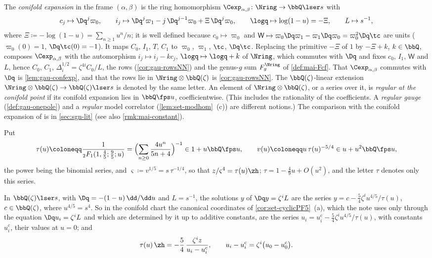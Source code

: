 \begin{defn}
The \emph{conifold expansion} in the frame $(\alpha,\beta)$ is the ring homomorphism $\Cexp_{\alpha,\beta}\colon\Nring\to\bbQ\lser s$ with
\[
c_j\mapsto\Dq^j\varpi_0,\qquad i_j\mapsto\Dq^j\varpi_1-j\,\Dq^{j-1}\varpi_0+\Xi\,\Dq^j\varpi_0,\qquad\logq\mapsto\log(1-u)=-\Xi,\qquad L\mapsto s^{-1},
\]
where $\Xi\coloneqq-\log(1-u)=\sum_{n\geq1}u^n/n$; it is well defined because $c_0\mapsto\varpi_0$ and $\mathsf W\mapsto\varpi_0\Dq\varpi_1-\varpi_1\Dq\varpi_0=\varpi_0^2\Dq\tc$ are units ($\varpi_0(0)=1$, $\Dq\tc(0)=-1$). It maps $C_0$, $I_1$, $T$, $C_1$ to $\varpi_0$, $\varpi_1$, $\tc$, $\Dq\tc$. Replacing the primitive $-\Xi$ of $1$ by $-\Xi+k$, $k\in\bbQ$, composes $\Cexp_{\alpha,\beta}$ with the automorphism $i_j\mapsto i_j-kc_j$, $\logq\mapsto\logq+k$ of $\Nring$, which commutes with $\Dq$ and fixes $c_0$, $I_1$, $\mathsf W$ and $L$, hence $C_0$, $C_1$, $\Delta_i^{1/2}=\zeta^{4i}C_0/L$, the rows (\cref{cor:gau-rowsNN}) and the genus-$g$ sum $F_g^{\Nring}$ of \cref{def:mai-Fcf}. That $\Cexp_{\alpha,\beta}$ commutes with $\Dq$ is \cref{lem:gau-confexp}, and that the rows lie in $\Nring\otimes\bbQ(\zeta)$ is \cref{cor:gau-rowsNN}. The $\bbQ(\zeta)$-linear extension $\Nring\otimes\bbQ(\zeta)\to\bbQ(\zeta)\lser s$ is denoted by the same letter. An element of $\Nring\otimes\bbQ(\zeta)$, or a series over it, is \emph{regular at the conifold point} if its conifold expansion lies in $\bbQ\fps u$, coefficientwise. (This includes the rationality of the coefficients. A \emph{regular gauge} (\cref{def:gau-onepole}) and a \emph{regular} model correlator (\cref{lem:set-modhom}~(c)) are different notions.) The comparison with the conifold expansion of \cite{CGYZ26} is in \cref{sec:sgn-lit} (see also \cref{rmk:mai-constant}).
\end{defn}

\begin{defn}
\label{def:set-tau}
Put
\[
\tau(u)\coloneqq\frac1{{}_2F_1(1,\frac45;\frac95;u)}=\Bigl(\sum_{n\geq0}\frac{4u^n}{5n+4}\Bigr)^{-1}\in1+u\bbQ\fps u,\qquad v(u)\coloneqq u\,\tau(u)^{-5/4}\in u+u^2\bbQ\fps u,
\]
the power being the binomial series, and $\varsigma\coloneqq v^{1/5}=s\,\tau^{-1/4}$, so that $z/\varsigma^4=\tau(u)\zh$; $\tau=1-\frac49u+O(u^2)$, and the letter $\tau$ denotes only this series.
\end{defn}

\begin{lem}
\label{lem:set-canon}
In $\bbQ(\zeta)\lser s$, with $\Dq=-(1-u)\,\dd/\dd u$ and $L=s^{-1}$, the solutions $y$ of $\Dq y=\zeta^iL$ are the series $y=c-\frac54\zeta^iu^{4/5}/\tau(u)$, $c\in\bbQ(\zeta)$, where $u^{4/5}=s^4$. So in the conifold chart the canonical coordinates of \cref{cor:set-cyclicPF5}~(a), which the note uses only through the equation $\Dq u_i=\zeta^iL$ and which are determined by it up to additive constants, are the series $u_i=u_i^{\mathrm c}-\frac54\zeta^iu^{4/5}/\tau(u)$, with constants $u_i^{\mathrm c}$, their values at $u=0$; and
\[
\tau(u)\,\zh=-\frac54\,\frac{\zeta^iz}{u_i-u_i^{\mathrm c}},\qquad u_i-u_i^{\mathrm c}=\zeta^i\bigl(u_0-u_0^{\mathrm c}\bigr).
\]
\end{lem}

